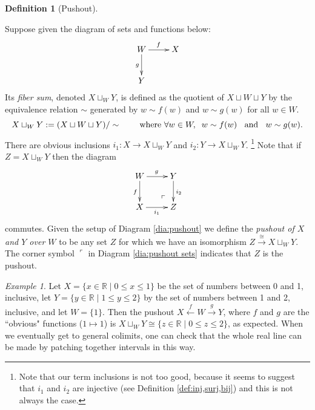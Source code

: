 \documentclass{book}
\makeatletter
\def\tn{\textnormal}
\def\RR{{\mathbb R}}
\def\hsp{\hspace{.3in}}
\def\to{\rightarrow}
\def\taking{\colon}
\def\iso{\cong}
\def\|{{\;|\;}}
\def\lrlimit{\ar@{}[lu]|(.3)*+{\ulcorner}}
\newcommand{\To}[1]{\xrightarrow{#1}}
\newcommand{\From}[1]{\xleftarrow{#1}}
\theoremstyle{remark}
\newtheorem{example}[subsubsection]{Example}
\theoremstyle{definition}
\newtheorem{definition}[subsubsection]{Definition}
\makeatother
\begin{document}
\begin{definition}[Pushout]\label{def:pushout}

Suppose given the diagram of sets and functions below:
\begin{align}\label{dia:pushout}
\xymatrix{W\ar[r]^f\ar[d]_g&X\\Y}
\end{align}
Its {\em fiber sum}, denoted $X\sqcup_WY$, is defined as the quotient of $X\sqcup W\sqcup Y$ by the equivalence relation $\sim$ generated by $w\sim f(w)$ and $w\sim g(w)$ for all $w\in W$.
$$X\sqcup_WY:=(X\sqcup W\sqcup Y)/\sim \hsp\tn{where } \forall w\in W,\;\;  w\sim f(w)\;\;\tn{ and }\;\; w\sim g(w).$$ 
There are obvious inclusions $i_1\taking X\to X\sqcup_WY$ and $i_2\taking Y\to X\sqcup_WY$.
\footnote{Note that our term inclusions is not too good, because it seems to suggest that $i_1$ and $i_2$ are injective (see Definition \ref{def:inj,surj,bij}) and this is not always the case.}
Note that if $Z=X\sqcup_WY$ then the diagram
\begin{align}\label{dia:pushout sets}
\xymatrix{W\ar[r]^g\ar[d]_f&Y\ar[d]^{i_2}\\X\ar[r]_-{i_1}&Z\lrlimit}
\end{align} 
commutes. Given the setup of Diagram \ref{dia:pushout} we define the {\em pushout of $X$ and $Y$ over $W$} to be any set $Z$ for which we have an isomorphism $Z\To{\iso}X\sqcup_WY$. The corner symbol $\ulcorner$ in Diagram \ref{dia:pushout sets} indicates that $Z$ is the pushout.

\end{definition}

\begin{example}

Let $X=\{x\in\RR\|0\leq x\leq1\}$ be the set of numbers between 0 and 1, inclusive, let $Y=\{y\in\RR\|1\leq y\leq 2\}$ by the set of numbers between 1 and 2, inclusive, and let $W=\{1\}$. Then the pushout $X\From{f} W\To{g} Y$, where $f$ and $g$ are the ``obvious" functions ($1\mapsto 1$) is $X\sqcup_WY\iso\{z\in\RR\|0\leq z\leq 2\}$, as expected. When we eventually get to general colimits, one can check that the whole real line can be made by patching together intervals in this way.

\end{example}
\end{document}
